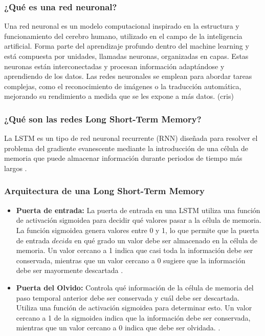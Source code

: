 \subsubsection{¿Qué es una red neuronal?}

Una red neuronal es un modelo computacional inspirado en la estructura y funcionamiento del cerebro humano, utilizado en el campo de la inteligencia artificial. Forma parte del aprendizaje profundo dentro del machine learning y está compuesta por unidades, llamadas neuronas, organizadas en capas. Estas neuronas están interconectadas y procesan información adaptándose y aprendiendo de los datos. Las redes neuronales se emplean para abordar tareas complejas, como el reconocimiento de imágenes o la traducción automática, mejorando su rendimiento a medida que se les expone a más datos. (cris)

\subsubsection{¿Qué son las redes Long Short-Term Memory?}

La LSTM es un tipo de red neuronal recurrente (RNN) diseñada para resolver el problema del gradiente evanescente mediante la introducción de una célula de memoria que puede almacenar información durante periodos de tiempo más largos \cite{redes-lstm-long-short-term-memory}.

\subsubsection{Arquitectura de una Long Short-Term Memory}

\begin{itemize}
    \item \textbf{Puerta de entrada:} La puerta de entrada en una LSTM utiliza una función de activación sigmoidea para decidir qué valores pasar a la célula de memoria. La función sigmoidea genera valores entre 0 y 1, lo que permite que la puerta de entrada \( decida \) en qué grado un valor debe ser almacenado en la célula de memoria. Un valor cercano a 1 indica que casi toda la información debe ser conservada, mientras que un valor cercano a 0 sugiere que la información debe ser mayormente descartada \cite{redes-lstm-long-short-term-memory}.
\end{itemize}

\begin{itemize}
    \item \textbf{Puerta del Olvido:} Controla qué información de la célula de memoria del paso temporal anterior debe ser conservada y cuál debe ser descartada. Utiliza una función de activación sigmoidea para determinar esto. Un valor cercano a 1 de la sigmoidea indica que la información debe ser conservada, mientras que un valor cercano a 0 indica que debe ser olvidada. \cite{redes-lstm-long-short-term-memory}.
\end{itemize}

